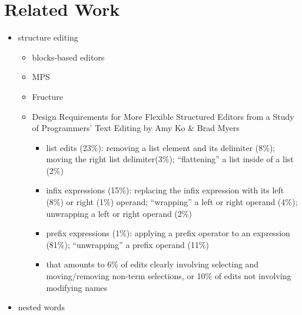 \section{Related Work}\label{sec:related-work}



\begin{itemize}
  \item structure editing
  \begin{itemize}
    \item blocks-based editors
    \item MPS
    \item Fructure
    \item Design Requirements for More Flexible Structured Editors from a Study of Programmers' Text Editing
      by Amy Ko \& Brad Myers
    \begin{itemize}
        \item list edits (23\%):
          removing a list element and its delimiter (8\%);
          moving the right list delimiter(3\%);
          ``flattening'' a list inside of a list (2\%)
        \item infix expressions (15\%):
            replacing the infix expression with its left (8\%) or right (1\%) operand;
            ``wrapping'' a left or right operand (4\%);
            unwrapping a left or right operand (2\%)
        \item prefix expressions (1\%):
            applying a prefix operator to an expression (81\%);
            ``unwrapping'' a prefix operand (11\%)
        \item that amounts to 6\% of edits clearly involving selecting and
          moving/removing non-term selections, or 10\% of edits not involving
          modifying names
    \end{itemize}
  \end{itemize}
  \item nested words
\end{itemize}